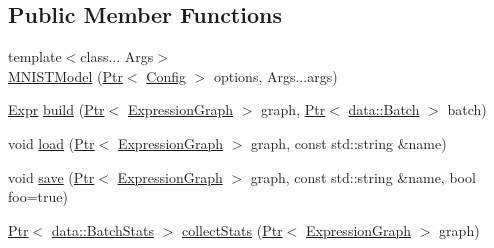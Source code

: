 \subsection*{Public Member Functions}
\begin{DoxyCompactItemize}
\item 
{\footnotesize template$<$class... Args$>$ }\\\hyperlink{classmarian_1_1models_1_1MNISTModel_a018d81eab7abfb2e97de6712a04a9f8a}{M\+N\+I\+S\+T\+Model} (\hyperlink{namespacemarian_ad1a373be43a00ef9ce35666145137b08}{Ptr}$<$ \hyperlink{classmarian_1_1Config}{Config} $>$ options, Args...\+args)
\item 
\hyperlink{namespacemarian_a498d8baf75b754011078b890b39c8e12}{Expr} \hyperlink{classmarian_1_1models_1_1MNISTModel_aacea07dc6d02c753955564f36df0959c}{build} (\hyperlink{namespacemarian_ad1a373be43a00ef9ce35666145137b08}{Ptr}$<$ \hyperlink{classmarian_1_1ExpressionGraph}{Expression\+Graph} $>$ graph, \hyperlink{namespacemarian_ad1a373be43a00ef9ce35666145137b08}{Ptr}$<$ \hyperlink{classmarian_1_1data_1_1Batch}{data\+::\+Batch} $>$ batch)
\item 
void \hyperlink{classmarian_1_1models_1_1MNISTModel_a2e46784797746aabdfe65fea058720ef}{load} (\hyperlink{namespacemarian_ad1a373be43a00ef9ce35666145137b08}{Ptr}$<$ \hyperlink{classmarian_1_1ExpressionGraph}{Expression\+Graph} $>$ graph, const std\+::string \&name)
\item 
void \hyperlink{classmarian_1_1models_1_1MNISTModel_a6aa8f9f5efe1b9ed5e84438c91f7bb0c}{save} (\hyperlink{namespacemarian_ad1a373be43a00ef9ce35666145137b08}{Ptr}$<$ \hyperlink{classmarian_1_1ExpressionGraph}{Expression\+Graph} $>$ graph, const std\+::string \&name, bool foo=true)
\item 
\hyperlink{namespacemarian_ad1a373be43a00ef9ce35666145137b08}{Ptr}$<$ \hyperlink{classmarian_1_1data_1_1BatchStats}{data\+::\+Batch\+Stats} $>$ \hyperlink{classmarian_1_1models_1_1MNISTModel_aacfb206fb5bda4dafde8a72ad1f059a5}{collect\+Stats} (\hyperlink{namespacemarian_ad1a373be43a00ef9ce35666145137b08}{Ptr}$<$ \hyperlink{classmarian_1_1ExpressionGraph}{Expression\+Graph} $>$ graph)
\end{DoxyCompactItemize}
